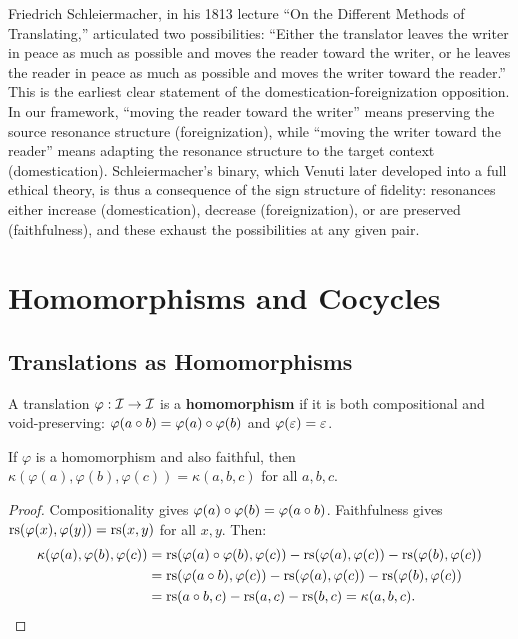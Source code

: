 \begin{remark}
Friedrich Schleiermacher, in his 1813 lecture ``On the Different Methods of Translating,'' articulated two possibilities: ``Either the translator leaves the writer in peace as much as possible and moves the reader toward the writer, or he leaves the reader in peace as much as possible and moves the writer toward the reader.''  This is the earliest clear statement of the domestication-foreignization opposition.  In our framework, ``moving the reader toward the writer'' means preserving the source resonance structure (foreignization), while ``moving the writer toward the reader'' means adapting the resonance structure to the target context (domestication).  Schleiermacher's binary, which Venuti later developed into a full ethical theory, is thus a consequence of the sign structure of fidelity: resonances either increase (domestication), decrease (foreignization), or are preserved (faithfulness), and these exhaust the possibilities at any given pair.
\end{remark}

\section{Homomorphisms and Cocycles}
\label{sec:translation:homomorphism}

\subsection{Translations as Homomorphisms}

\begin{definition}[Homomorphism]
\label{def:homomorphism}
A translation $\varphi : \mathcal{I} \to \mathcal{I}$ is a \textbf{homomorphism} if it
is both compositional and void-preserving: $\varphi(a \circ b) =
\varphi(a) \circ \varphi(b)$ and $\varphi(\varepsilon) = \varepsilon$.
\end{definition}

\begin{theorem}
\label{thm:homomorphism-emergence}
If $\varphi$ is a homomorphism and also faithful, then
$\kappa(\varphi(a), \varphi(b), \varphi(c)) = \kappa(a, b, c)$
for all $a, b, c$.
\end{theorem}

\begin{proof}
Compositionality gives $\varphi(a) \circ \varphi(b) = \varphi(a \circ b)$.
Faithfulness gives $\mathrm{rs}(\varphi(x), \varphi(y)) = \mathrm{rs}(x, y)$ for all $x, y$.
Then:
\begin{align*}
  \kappa(\varphi(a), \varphi(b), \varphi(c))
    &= \mathrm{rs}(\varphi(a) \circ \varphi(b), \varphi(c))
       - \mathrm{rs}(\varphi(a), \varphi(c)) - \mathrm{rs}(\varphi(b), \varphi(c)) \\
    &= \mathrm{rs}(\varphi(a \circ b), \varphi(c))
       - \mathrm{rs}(\varphi(a), \varphi(c)) - \mathrm{rs}(\varphi(b), \varphi(c)) \\
    &= \mathrm{rs}(a \circ b, c) - \mathrm{rs}(a, c) - \mathrm{rs}(b, c)
     = \kappa(a, b, c).
\end{align*}
\end{proof}

